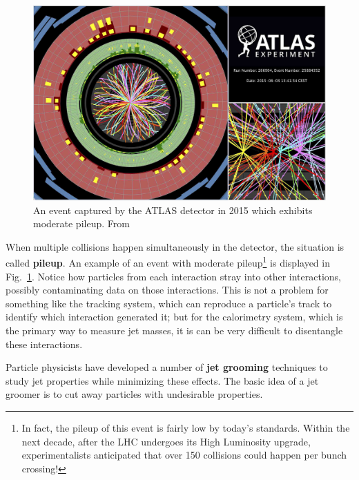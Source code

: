 \documentclass[../thesis.tex]{subfiles}
\begin{document}
	\begin{figure}
	\begin{center}
		\includegraphics[width=\textwidth]{figures/atlas_pile_up.jpeg}
		\caption{\label{technical-fig:pileup}An event captured by the ATLAS detector in 2015 which exhibits moderate pileup. From \cite{atlas_collaboration_event_nodate-1}}
	\end{center}
	\end{figure}

	When multiple collisions happen simultaneously in the detector, the situation is called \textbf{pileup}. An example of an event with moderate pileup\footnote{In fact, the pileup of this event is fairly low by today's standards. Within the next decade, after the LHC undergoes its High Luminosity upgrade, experimentalists anticipated that over 150 collisions could happen per bunch crossing!} is displayed in Fig.~\ref{technical-fig:pileup}. Notice how particles from each interaction stray into other interactions, possibly contaminating data on those interactions. This is not a problem for something like the tracking system, which can reproduce a particle's track to identify which interaction generated it; but for the calorimetry system, which is the primary way to measure jet masses, it is can be very difficult to disentangle these interactions.

	Particle physicists have developed a number of \textbf{jet grooming} techniques to study jet properties while minimizing these effects. The basic idea of a jet groomer is to cut away particles with undesirable properties.
\end{document}
